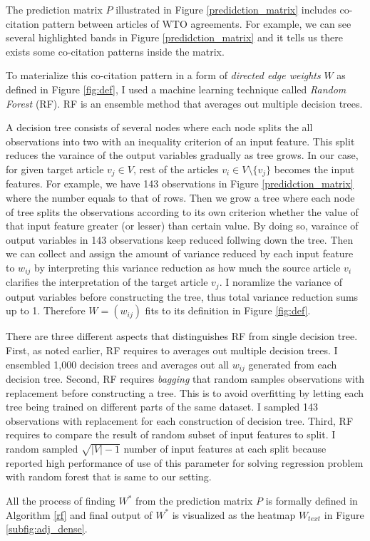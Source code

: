 The prediction matrix $P$ illustrated in Figure \ref{predidction_matrix}
includes co-citation pattern between articles of WTO agreements. For example,
we can see several highlighted bands in Figure \ref{predidction_matrix}
and it tells us there exists some co-citation patterns inside the matrix.

To materialize this co-citation pattern in a form of \textit{directed edge weights} $W$ as defined in Figure \ref{fig:def},
I used a machine learning technique called \textit{Random Forest} (RF). RF is an ensemble method that averages out
multiple decision trees.

A decision tree consists of several nodes where each node splits the all observations into two with an inequality criterion of an input feature.
This split reduces the varaince of the output variables gradually as tree grows.
In our case, for given target article $v_j \in V$, rest of the articles $v_i \in V \setminus \{v_j\}$ becomes the input features.
For example, we have 143 observations in Figure \ref{predidction_matrix} where the number equals to that of rows.
Then we grow a tree where each node of tree splits
the observations according to its own criterion
whether the value of that input feature greater (or lesser) than certain value.
By doing so,
varaince of output variables in 143 observations keep reduced follwing down the tree.
Then we can collect and assign the amount of variance reduced by each input feature to $w_{ij}$
by interpreting this variance reduction as how much
the source article $v_i$ clarifies the interpretation of the target article $v_j$.
I noramlize the variance of output variables before constructing the tree, thus total variance reduction
sums up to 1. Therefore $W = (w_{ij})$ fits to its definition in Figure \ref{fig:def}.

There are three different aspects that distinguishes RF from single decision tree.
First, as noted earlier, RF requires to averages out multiple decision trees.
I ensembled 1,000 decision trees and averages out all $w_{ij}$ generated from each decision tree.
Second, RF requires \textit{bagging} that random samples observations with replacement before constructing a tree.
This is to avoid overfitting by letting each tree being trained on different parts of the same dataset. 
I sampled 143 observations with replacement for each construction of decision tree. 
Third, RF requires to compare the result of random subset of input features to split.
I random sampled $\sqrt{|V|-1}$ number of input features at each split because \cite{genie3} reported high performance of use of this parameter for solving regression problem with random forest that is same to our setting.

All the process of finding $W^*$ from the prediction matrix $P$ is formally defined in Algorithm \ref{rf} and final output of $W^*$ is visualized as the heatmap $W_{text}$ in Figure \ref{subfig:adj_dense}.